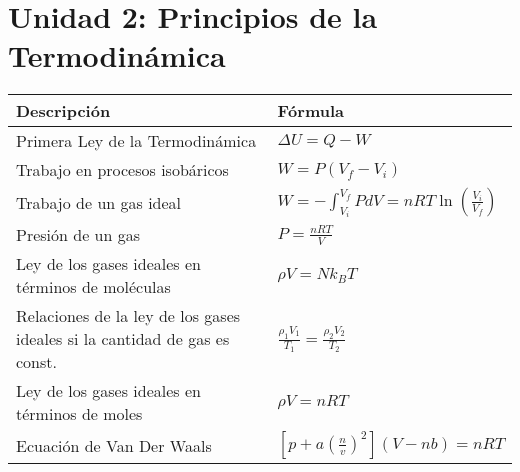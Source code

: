 \documentclass[a4paper,12pt]{article}
\begin{document}
	\section{Unidad 2: Principios de la Termodinámica}
	\renewcommand{\arraystretch}{1.5}
	\begin{center}
		\begin{tabularx}{\textwidth}{|X|X|}
			\hline
			\textbf{Descripción} & \textbf{Fórmula} \\ \hline
			Primera Ley de la Termodinámica & $\Delta U = Q - W$ \\ \hline
			Trabajo en procesos isobáricos & $W = P({V_f} - {V_i})$ \\ \hline
			Trabajo de un gas ideal & $W = - \int_{V_i}^{V_f} PdV = nRT \ln ( \frac{V_i}{V_f})$ \\ \hline
			Presión de un gas & $P = \frac{n R T}{V}$ \\ \hline
			Ley de los gases ideales en términos de moléculas & $\rho V = N k_B T$\\ \hline
			Relaciones de la ley de los gases ideales si la cantidad de gas es const. & $\frac{{\rho}_1 V_1}{T_1} = \frac{{\rho}_2 V_2}{T_2}$ \\ \hline
			Ley de los gases ideales en términos de moles & $\rho V = n R T$ \\ \hline
			Ecuación de Van Der Waals & $[p + a {( \frac{n}{v} )}^2] (V - nb) = n R T$ \\ \hline
		\end{tabularx}
	\end{center}
\end{document}
